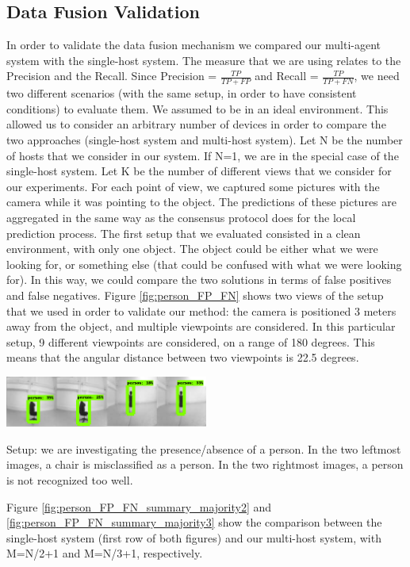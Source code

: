\documentclass[10pt,conference,compsocconf]{IEEEtran}
\begin{document}
\subsection{Data Fusion Validation}
In order to validate the data fusion mechanism we compared our multi-agent system with the single-host system. The measure that we are using relates to the Precision and the Recall. Since Precision = $\frac{TP}{TP+FP}$ and Recall = $\frac{TP}{TP+FN}$, we need two different scenarios (with the same setup, in order to have consistent conditions) to evaluate them.
We assumed to be in an ideal environment. This allowed us to consider an arbitrary number of devices in order to compare the two approaches (single-host system and multi-host system). Let N be the number of hosts that we consider in our system. If N=1, we are in the special case of the single-host system. Let K be the number of different views that we consider for our experiments. For each point of view, we captured some pictures with the camera while it was pointing to the object. The predictions of these pictures are aggregated in the same way as the consensus protocol does for the local prediction process.
The first setup that we evaluated consisted in a clean environment, with only one object. The object could be either what we were looking for, or something else (that could be confused with what we were looking for). In this way, we could compare the two solutions in terms of false positives and false negatives.
Figure \ref{fig:person_FP_FN} shows two views of the setup that we used in order to validate our method: the camera is positioned 3 meters away from the object, and multiple viewpoints are considered. In this particular setup, 9 different viewpoints are considered, on a range of 180 degrees. This means that the angular distance between two viewpoints is 22.5 degrees.
\begin{center}
	\captionsetup{type=figure}
	\includegraphics[width=0.5\textwidth]{img/person_FP_FN.png}
	\caption {Setup: we are investigating the presence/absence of a person. In the two leftmost images, a chair is misclassified as a person. In the two rightmost images, a person is not recognized too well.}
	\label{fig:person_FP_FN}
\end{center}
Figure \ref{fig:person_FP_FN_summary_majority2} and \ref{fig:person_FP_FN_summary_majority3} show the comparison between the single-host system (first row of both figures) and our multi-host system, with M=N/2+1 and M=N/3+1, respectively.
\end{document}
